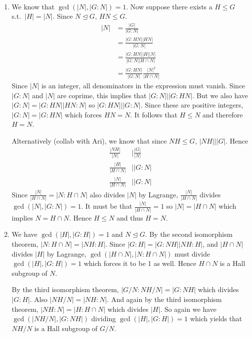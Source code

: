 \documentclass[12pt]{article}
\begin{document}
\begin{problem}[4]
~\begin{enumerate}[label=(\alph*)]
	\item We know that $ \gcd (|N|,|G:N|) = 1$. Now suppose there exists a $ H \leq G$  s.t.\ $ |H| = |N|$. Since  $ N \trianglelefteq G$, $ HN \leq G$. 
		 \begin{align*}
			|N| &= \frac{|G|}{|G:N|} \\
			&= \frac{|G:HN||HN|}{ |G:N|} \\
			&= \frac{|G:HN||H||N|}{ |G:N||H \cap N|} \\
			&= \frac{|G:HN|}{ |G:N|} \frac{|N|^2}{ |H \cap N|} 
		\end{align*}
		Since $ |N|$ is an integer, all denominators in the expression must vanish. Since  $ |G:N|$ and  $ |N|$ are coprime, this implies that  $ |G:N| | |G:HN|$. But we also have  $ |G:N|=|G:HN||HN:N| $ so $ |G:HN|||G:N|$. Since these are positive integers,  $ |G:N| = |G:HN|$ which forces $ HN = N$. It follows that $ H \leq N$ and therefore  $ H=N$.

		Alternatively (collab with Ari), we know that since $ NH \leq G$, $ |NH|||G|$. Hence
		\begin{align*}
			\frac{|NH|}{|N|} &\bigg| \frac{ |G|}{ |N|} \\
			\frac{|H|}{|H \cap N|}&\bigg| |G:N| \\
			\frac{|N|}{|H \cap N|}&\bigg| |G:N| 
		\end{align*}
		Since $ \frac{|N|}{|H \cap N|} = |N:H \cap N|$ also divides $ |N|$ by Lagrange, $ \frac{|N|}{|H \cap N|}$ divides $ \gcd ( |N|, |G:N|) =1$. It must be that $ \frac{|N|}{|H \cap N|} = 1$ so $ |N| = |H \cap N|$ which implies $ N = H \cap N$. Hence $ H \leq N$ and thus  $ H = N$.
	\item We have $ \gcd ( |H|,|G:H|) =1$ and $ N \trianglelefteq G$. By the second isomorphism theorem, $ |N: H \cap N| = |NH: H|$. Since $ |G:H| = |G:NH||NH:H|$, and  $ |H \cap N|$ divides $ |H|$ by Lagrange, $ \gcd ( |H \cap N|, |N: H \cap N|) $ must divide $ \gcd ( |H|,|G:H|)=1 $ which forces it to be 1 as well. Hence $ H \cap N$ is a Hall subgroup of $ N$.

		By the third isomorphism theorem, $ |G /N : NH /N| = |G:NH|$ which divides $ |G:H|$. Also $ |NH /N| = |NH:N|$. And again by the third isomorphism theorem, $ |NH:N| = |H : H \cap N|$ which divides $ |H|$. So again we have $ \gcd ( |NH/N|, |G:NH|)$ dividing $ \gcd ( |H|,|G:H|) =1$ which yields that $ NH /N$ is a Hall subgroup of  $ G /N$.
\end{enumerate}
\end{problem}
\end{document}

